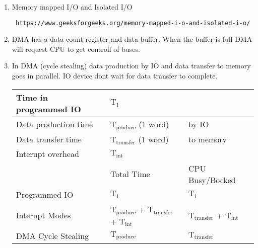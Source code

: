 \begin{enumerate}

    \item Memory mapped I/O and Isolated I/O \begin{verbatim} https://www.geeksforgeeks.org/memory-mapped-i-o-and-isolated-i-o/\end{verbatim}

    \item DMA has a data count register and data buffer. When the buffer is full DMA will request CPU
          to get controll of buses.

    \item In DMA (cycle stealing) data production by IO and data transfer to memory goes in parallel.
          IO device dont wait for data transfer to complete.
        \begin{myTableStyle} \begin{tabular}{ |m{4cm}|m{4cm}|m{3cm}| } \hline
            Time in programmed IO                       & \(\text{T}_{\text{1}}\)  &     \\ \hline
            Data production time   & \(\text{T}_{\text{produce}}\) (1 word)  &   by IO   \\ \hline
            Data transfer time     & \(\text{T}_{\text{transfer}}\) (1 word)  & to memory    \\ \hline
            Interupt overhead                           & \(\text{T}_{\text{int}}\)  &     \\ \hline
                                                        & Total Time & CPU Busy/Bocked \\ \hline
            Programmed IO                               & \(\text{T}_{\text{1}}\) & \(\text{T}_{\text{1}}\) \\ \hline

            Interupt Modes  & \(\text{T}_{\text{produce}}\) + \(\text{T}_{\text{transfer}}\) + \(\text{T}_{\text{int}}\)
                            & \(\text{T}_{\text{transfer}}\) + \(\text{T}_{\text{int}}\) \\ \hline

            DMA Cycle Stealing & \(\text{T}_{\text{produce}}\) & \(\text{T}_{\text{transfer}}\) \\ \hline
        \end{tabular} \end{myTableStyle} \vspace{0.08in}

\end{enumerate}
